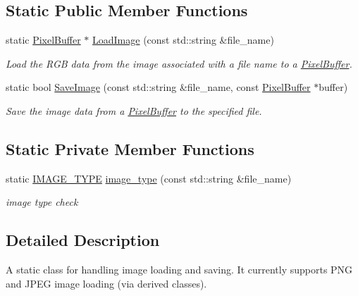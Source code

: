\subsection*{Static Public Member Functions}
\begin{DoxyCompactItemize}
\item 
static \hyperlink{classimage__tools_1_1PixelBuffer}{Pixel\+Buffer} $\ast$ \hyperlink{classimage__tools_1_1ImageHandler_aad1dfd6cf01b3b99f14d5be0f5adad7b}{Load\+Image} (const std\+::string \&file\+\_\+name)
\begin{DoxyCompactList}\small\item\em Load the R\+GB data from the image associated with a file name to a \hyperlink{classimage__tools_1_1PixelBuffer}{Pixel\+Buffer}. \end{DoxyCompactList}\item 
static bool \hyperlink{classimage__tools_1_1ImageHandler_a699e712126c1cd81be7829d277a12fc7}{Save\+Image} (const std\+::string \&file\+\_\+name, const \hyperlink{classimage__tools_1_1PixelBuffer}{Pixel\+Buffer} $\ast$buffer)
\begin{DoxyCompactList}\small\item\em Save the image data from a \hyperlink{classimage__tools_1_1PixelBuffer}{Pixel\+Buffer} to the specified file. \end{DoxyCompactList}\end{DoxyCompactItemize}
\subsection*{Static Private Member Functions}
\begin{DoxyCompactItemize}
\item 
static \hyperlink{classimage__tools_1_1ImageHandler_a1ad849e8783b00364ed9353861540868}{I\+M\+A\+G\+E\+\_\+\+T\+Y\+PE} \hyperlink{classimage__tools_1_1ImageHandler_a581d3d4835efd20091225b67395c105e}{image\+\_\+type} (const std\+::string \&file\+\_\+name)\hypertarget{classimage__tools_1_1ImageHandler_a581d3d4835efd20091225b67395c105e}{}\label{classimage__tools_1_1ImageHandler_a581d3d4835efd20091225b67395c105e}

\begin{DoxyCompactList}\small\item\em image type check \end{DoxyCompactList}\end{DoxyCompactItemize}


\subsection{Detailed Description}
A static class for handling image loading and saving. It currently supports P\+NG and J\+P\+EG image loading (via derived classes). 


